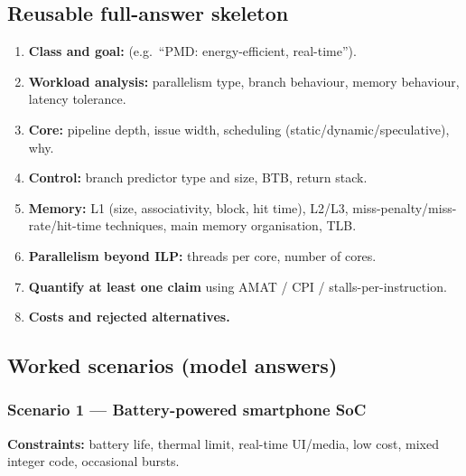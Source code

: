 \subsection{Reusable full-answer skeleton}
\begin{enumerate}[leftmargin=*]
\item \textbf{Class and goal:} (e.g.\ ``PMD: energy-efficient, real-time'').
\item \textbf{Workload analysis:} parallelism type, branch behaviour, memory behaviour, latency tolerance.
\item \textbf{Core:} pipeline depth, issue width, scheduling (static/dynamic/speculative), why.
\item \textbf{Control:} branch predictor type and size, BTB, return stack.
\item \textbf{Memory:} L1 (size, associativity, block, hit time), L2/L3, miss-penalty/miss-rate/hit-time techniques, main memory organisation, TLB.
\item \textbf{Parallelism beyond ILP:} threads per core, number of cores.
\item \textbf{Quantify at least one claim} using AMAT / CPI / stalls-per-instruction.
\item \textbf{Costs and rejected alternatives.}
\end{enumerate}

\subsection{Worked scenarios (model answers)}

\subsubsection*{Scenario 1 --- Battery-powered smartphone SoC}
\textbf{Constraints:} battery life, thermal limit, real-time UI/media, low cost, mixed integer code, occasional bursts.

